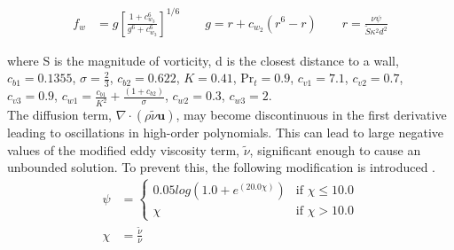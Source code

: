 \begin{align}
	f_w &= g\left[\frac{1 + c_{w_3}^6}{g^6 + c_{w_3}^6}\right]^{1/6} 
	\qquad g = r + c_{w_2}(r^6 - r) 
	\qquad r = \frac{\nu\psi}{\tilde S \kappa^2 d^2}
\end{align}

where S is the magnitude of vorticity, d is the closest distance to a wall, $c_{b1} = 0.1355$, $\sigma = \frac{2}{3}$, $c_{b2} = 0.622$, $K = 0.41$, $\text{Pr}_t = 0.9$, $c_{v1} = 7.1$, $c_{v2} = 0.7$, $c_{v3} = 0.9$, $c_{w1} = \frac{c_{b1}}{K^2} + \frac{(1+c_{b2})}{\sigma}$, $c_{w2} = 0.3$, $c_{w3} = 2$.\\

The diffusion term, $\nabla\cdot(\rho\tilde\nu\boldsymbol{u})$, may become discontinuous in the first derivative leading to oscillations in high-order polynomials. This can lead to large negative values of the modified eddy viscosity term, $\tilde\nu$, significant enough to cause an unbounded solution. To prevent this, the following modification is introduced \cite{moro2011navier}.
\begin{align}
	\psi &=
	\begin{cases}
	   0.05log(1.0 + e^{(20.0\chi)}) & \text{if } \chi \le 10.0 \\
	   \chi & \text{if } \chi > 10.0
	\end{cases} \\
	\chi &= \frac{\tilde\nu}{\nu}
\end{align}
